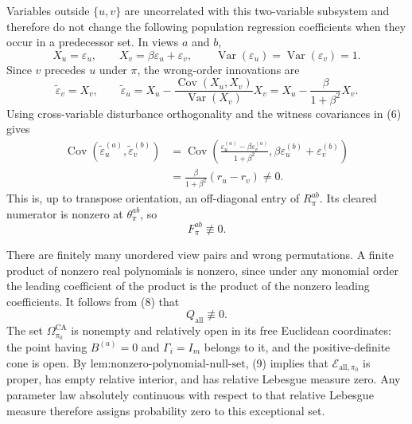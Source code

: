 Variables outside \(\{u,v\}\) are uncorrelated with this two-variable subsystem and therefore do not change the following population regression coefficients when they occur in a predecessor set.  In views \(a\) and \(b\),
\[
X_u=\varepsilon_u,
\qquad
X_v=\beta\varepsilon_u+\varepsilon_v,
\qquad
\operatorname{Var}(\varepsilon_u)=\operatorname{Var}(\varepsilon_v)=1.
\tag{5}
\]
Since \(v\) precedes \(u\) under \(\pi\), the wrong-order innovations are
\[
\widetilde\varepsilon_v=X_v,
\qquad
\widetilde\varepsilon_u
=X_u-\frac{\operatorname{Cov}(X_u,X_v)}{\operatorname{Var}(X_v)}X_v
=X_u-\frac{\beta}{1+\beta^2}X_v.
\tag{6}
\]
Using cross-variable disturbance orthogonality and the witness covariances in (6) gives
\[
\begin{aligned}
\operatorname{Cov}\!\left(\widetilde\varepsilon_u^{(a)},
\widetilde\varepsilon_v^{(b)}\right)
&=\operatorname{Cov}\!\left(
\frac{\varepsilon_u^{(a)}-\beta\varepsilon_v^{(a)}}{1+\beta^2},
\beta\varepsilon_u^{(b)}+\varepsilon_v^{(b)}\right)\\
&=\frac{\beta}{1+\beta^2}(r_u-r_v)\ne0.
\end{aligned}
\tag{7}
\]
This is, up to transpose orientation, an off-diagonal entry of \(R_\pi^{ab}\).  Its cleared numerator is nonzero at \(\theta_\pi^{ab}\), so
\[
F_\pi^{ab}\not\equiv0.
\tag{8}
\]

There are finitely many unordered view pairs and wrong permutations.  A finite product of nonzero real polynomials is nonzero, since under any monomial order the leading coefficient of the product is the product of the nonzero leading coefficients.  It follows from (8) that
\[
Q_{\mathrm{all}}\not\equiv0.
\tag{9}
\]
The set \(\Omega_{\pi_0}^{\mathrm{CA}}\) is nonempty and relatively open in its free Euclidean coordinates: the point having \(B^{(a)}=0\) and \(\Gamma_i=I_m\) belongs to it, and the positive-definite cone is open.  By \(\text{lem:nonzero-polynomial-null-set}\), (9) implies that \(\mathcal E_{\mathrm{all},\pi_0}\) is proper, has empty relative interior, and has relative Lebesgue measure zero.  Any parameter law absolutely continuous with respect to that relative Lebesgue measure therefore assigns probability zero to this exceptional set.

